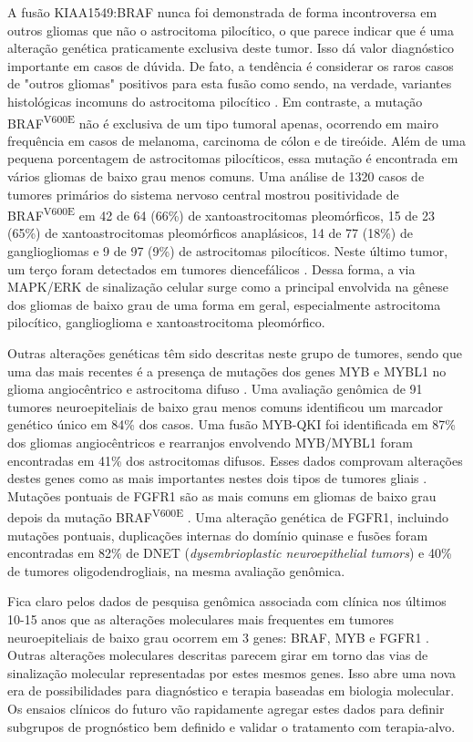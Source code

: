 \documentclass[11pt,a4paper,oldfontcommands]{memoir}
\begin{document}
A fusão KIAA1549:BRAF nunca foi demonstrada de forma incontroversa em outros gliomas que não o astrocitoma pilocítico, o que parece indicar que é uma alteração genética praticamente exclusiva deste tumor. Isso dá valor diagnóstico importante em casos de dúvida. De fato, a tendência é considerar os raros casos de "outros gliomas" positivos para esta fusão como sendo, na verdade, variantes histológicas incomuns do astrocitoma pilocítico \cite{Jones2012}. Em contraste, a mutação BRAF\textsuperscript{V600E} não é exclusiva de um tipo tumoral apenas, ocorrendo em mairo frequência em casos de melanoma, carcinoma de cólon e de tireóide. Além de uma pequena porcentagem de astrocitomas pilocíticos, essa mutação é encontrada em vários gliomas de baixo grau menos comuns. Uma análise de 1320 casos de tumores primários do sistema nervoso central mostrou positividade de BRAF\textsuperscript{V600E} em 42 de 64 (66\%) de xantoastrocitomas pleomórficos, 15 de 23 (65\%) de xantoastrocitomas pleomórficos anaplásicos, 14 de 77 (18\%) de gangliogliomas e 9 de 97 (9\%) de astrocitomas pilocíticos. Neste último tumor, um terço foram detectados em tumores diencefálicos \cite{Schindler2011}. Dessa forma, a via MAPK/ERK de sinalização celular surge como a principal envolvida na gênese dos gliomas de baixo grau de uma forma em geral, especialmente astrocitoma pilocítico, ganglioglioma e xantoastrocitoma pleomórfico.

Outras alterações genéticas têm sido descritas neste grupo de tumores, sendo que uma das mais recentes é a presença de mutações dos genes MYB e MYBL1 no glioma angiocêntrico e astrocitoma difuso \cite{Tatevossian2010}. Uma avaliação genômica de 91 tumores neuroepiteliais de baixo grau menos comuns identificou um marcador genético único em 84\% dos casos. Uma fusão MYB-QKI foi identificada em 87\% dos gliomas angiocêntricos e rearranjos envolvendo MYB/MYBL1 foram encontradas em 41\% dos astrocitomas difusos. Esses dados comprovam alterações destes genes como as mais importantes nestes dois tipos de tumores gliais \cite{Qadoummi2016}. Mutações pontuais de FGFR1 são as mais comuns em gliomas de baixo grau depois da mutação BRAF\textsuperscript{V600E} \cite{now209}. Uma alteração genética de FGFR1, incluindo mutações pontuais, duplicações internas do domínio quinase e fusões foram encontradas em 82\% de DNET (\textit{dysembrioplastic neuroepithelial tumors}) e 40\% de tumores oligodendrogliais, na mesma avaliação genômica.

Fica claro pelos dados de pesquisa genômica associada com clínica nos últimos 10-15 anos que as alterações moleculares mais frequentes em tumores neuroepiteliais de baixo grau ocorrem em 3 genes: BRAF, MYB e FGFR1 \cite{now209,Qadoummi2016}. Outras alterações moleculares descritas parecem girar em torno das vias de sinalização molecular representadas por estes mesmos genes. Isso abre uma nova era de possibilidades para diagnóstico e terapia baseadas em biologia molecular. Os ensaios clínicos do futuro vão rapidamente agregar estes dados para definir subgrupos de prognóstico bem definido e validar o tratamento com terapia-alvo.
\end{document}
